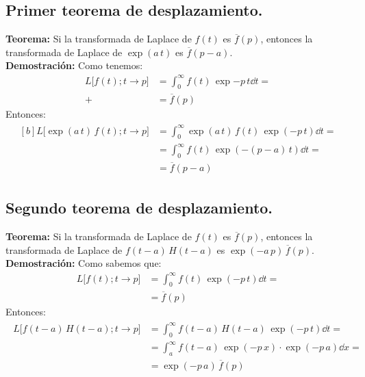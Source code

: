 \subsection{Primer teorema de desplazamiento.}

\noindent \textbf{Teorema: } Si la transformada de Laplace de $f(t)$ es $\overline{f}(p)$, entonces la transformada de Laplace de $\exp(a \, t)$ es $\overline{f}(p - a)$.
\\[0.5em]
\textbf{Demostración: } Como tenemos:
\begin{align*}
L \big[f(t); t \to p\big] &= \int_{0}^{\infty} f(t) \, \exp{-p \, t} \dd{t} = \\[0.5em]+
&= \overline{f} (p)
\end{align*}
Entonces:
\begin{align}
\begin{aligned}[b]
L \big[\exp (a \, t) \, f(t); t \to p\big] &= \int_{0}^{\infty} \exp(a \, t) \, f(t) \, \exp(-p \, t) \dd{t} = \\[0.5em]
&= \int_{0}^{\infty} f(t) \, \exp(-(p - a) \, t) \dd{t} = \\[0.5em]
&= \overline{f} (p - a)
\end{aligned}
\label{eq:ecuacion_03_07}
\end{align}

\subsection{Segundo teorema de desplazamiento.}

\noindent \textbf{Teorema: } Si la transformada de Laplace de $f(t)$ es $\overline{f}(p)$, entonces la transformada de Laplace de $f(t - a) \, H(t - a)$ es $\exp(-a \, p) \, \overline{f}(p)$.
\\[0.5em]
\textbf{Demostración: } 
Como sabemos que:
\begin{align*}
L \big[f(t); t \to p\big] &= \int_{0}^{\infty} f(t) \, \exp(-p \, t) \dd{t} = \\[0.5em]
&= \overline{f} (p)
\end{align*}
Entonces:
\begin{align}
\begin{aligned}
L \big[f(t - a) \, H (t - a); t \to p\big] &= \int_{0}^{\infty} f(t - a) \, H(t - a) \, \exp(-p \, t) \dd{t} = \\[0.5em]
&= \int_{a}^{\infty} f(t - a) \, \exp(-p \, x) \cdot \exp(-p \, a) \dd{x} = \\[0.5em]
&= \exp(-p \, a) \, \overline{f} (p) 
\end{aligned}
\label{eq:ecuacion_03_08}
\end{align}

